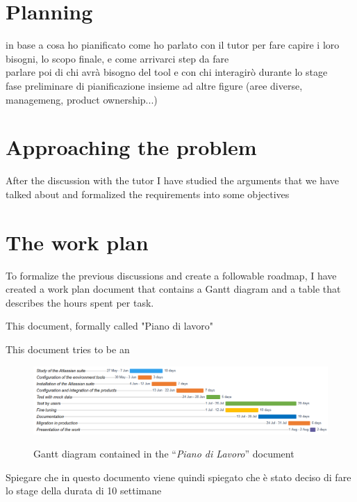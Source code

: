 \section{Planning}
in base a cosa ho pianificato
come ho parlato con il tutor per fare capire i loro bisogni, lo scopo finale, e come arrivarci
step da fare\\
parlare poi di chi avrà bisogno del tool e con chi interagirò durante lo stage\\
fase preliminare di pianificazione insieme ad altre figure (aree diverse, managemeng, product ownership...)

\section{Approaching the problem}

	After the discussion with the tutor I have studied the arguments that we have talked about and formalized the requirements into some objectives

\section{The work plan}

	To formalize the previous discussions and create a followable roadmap, I have created a work plan document that contains a Gantt diagram and a table that describes the hours spent per task.
	
	This document, formally called "Piano di lavoro"
	
	This document tries to be an
	
	\begin{figure}[H]
		\centering
		\includegraphics[width=1.1\textwidth]{resources/work_plan_gantt}\\
		\caption{Gantt diagram contained in the ``\textit{Piano di Lavoro}'' document}
	\end{figure}

	Spiegare che in questo documento viene quindi spiegato che è stato deciso di fare lo stage della durata di 10 settimane


